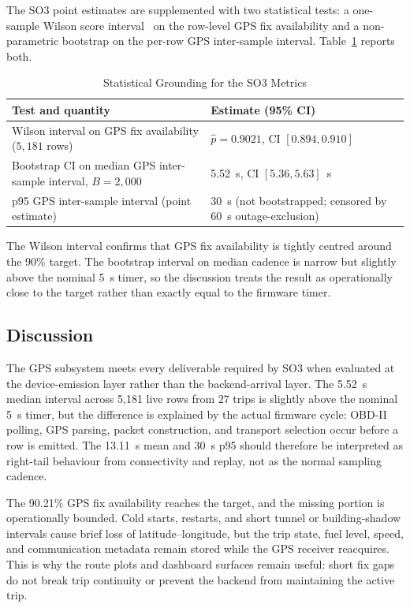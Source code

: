 The SO3 point estimates are supplemented with two statistical tests: a one-sample Wilson score interval~\cite{wilson1927probable} on the row-level GPS fix availability and a non-parametric bootstrap on the per-row GPS inter-sample interval. Table~\ref{tab:so3_stats} reports both.

\begin{table}[!htbp]
\centering
\caption{Statistical Grounding for the SO3 Metrics}
\label{tab:so3_stats}
\small
\begin{tabular}{|p{}|p{}|}
\hline
\textbf{Test and quantity} & \textbf{Estimate (95\% CI)} \\
\hline
Wilson interval on GPS fix availability ($5{,}181$ rows) & $\hat{p} = 0.9021$, CI $[0.894, 0.910]$ \\
\hline
Bootstrap CI on median GPS inter-sample interval, $B = 2{,}000$ & 5.52~s, CI $[5.36, 5.63]$~s \\
\hline
p95 GPS inter-sample interval (point estimate) & 30~s (not bootstrapped; censored by 60~s outage-exclusion) \\
\hline
\end{tabular}
\end{table}

The Wilson interval confirms that GPS fix availability is tightly centred around the 90\% target. The bootstrap interval on median cadence is narrow but slightly above the nominal 5~s timer, so the discussion treats the result as operationally close to the target rather than exactly equal to the firmware timer.

\FloatBarrier
\subsection{Discussion}
The GPS subsystem meets every deliverable required by SO3 when evaluated at the device-emission layer rather than the backend-arrival layer. The 5.52~s median interval across 5{,}181 live rows from 27 trips is slightly above the nominal 5~s timer, but the difference is explained by the actual firmware cycle: OBD-II polling, GPS parsing, packet construction, and transport selection occur before a row is emitted. The 13.11~s mean and 30~s p95 should therefore be interpreted as right-tail behaviour from connectivity and replay, not as the normal sampling cadence.

The 90.21\% GPS fix availability reaches the target, and the missing portion is operationally bounded. Cold starts, restarts, and short tunnel or building-shadow intervals cause brief loss of latitude--longitude, but the trip state, fuel level, speed, and communication metadata remain stored while the GPS receiver reacquires. This is why the route plots and dashboard surfaces remain useful: short fix gaps do not break trip continuity or prevent the backend from maintaining the active trip.


